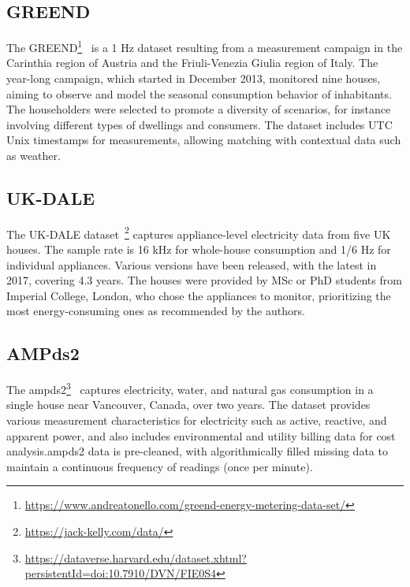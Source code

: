 \subsection{GREEND}

The GREEND\footnote{\url{https://www.andreatonello.com/greend-energy-metering-data-set/}}~\parencite{monacchiGREENDEnergyConsumption2014} is a 1 Hz dataset resulting from a measurement campaign in the Carinthia region of Austria and the Friuli-Venezia Giulia region of Italy. The year-long campaign, which started in December 2013, monitored nine houses, aiming to observe and model the seasonal consumption behavior of inhabitants. The householders were selected to promote a diversity of scenarios, for instance involving different types of dwellings and consumers. The dataset includes UTC Unix timestamps for measurements, allowing matching with contextual data such as weather.

\subsection{UK-DALE}

The UK-DALE dataset~\parencite{kellyUKDALEDatasetDomestic2015}\footnote{\url{https://jack-kelly.com/data/}} captures appliance-level electricity data from five UK houses. The sample rate is 16 kHz for whole-house consumption and 1/6 Hz for individual appliances. Various versions have been released, with the latest in 2017, covering 4.3 years. The houses were provided by MSc or PhD students from Imperial College, London, who chose the appliances to monitor, prioritizing the most energy-consuming ones as recommended by the authors.


\subsection{AMPds2}

The \acrlong{ampds2}\footnote{\url{https://dataverse.harvard.edu/dataset.xhtml?persistentId=doi:10.7910/DVN/FIE0S4}}~\parencite{makoninElectricityWaterNatural2016} captures electricity, water, and natural gas consumption in a single house near Vancouver, Canada, over two years. The dataset provides various measurement characteristics for electricity such as active, reactive, and apparent power, and also includes environmental and utility billing data for cost analysis.\@ \acrshort{ampds2} data is pre-cleaned, with algorithmically filled missing data to maintain a continuous frequency of readings (once per minute).

